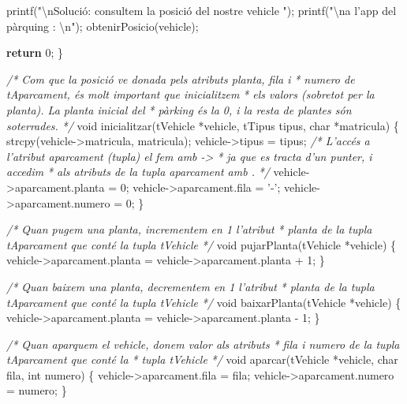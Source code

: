 \documentclass[]{book}
\newenvironment{Shaded}{\begin{snugshade}}{\end{snugshade}}
\newcommand{\DataTypeTok}[1]{\textcolor[rgb]{0.13,0.29,0.53}{#1}}
\newcommand{\DecValTok}[1]{\textcolor[rgb]{0.00,0.00,0.81}{#1}}
\newcommand{\CharTok}[1]{\textcolor[rgb]{0.31,0.60,0.02}{#1}}
\newcommand{\SpecialCharTok}[1]{\textcolor[rgb]{0.00,0.00,0.00}{#1}}
\newcommand{\StringTok}[1]{\textcolor[rgb]{0.31,0.60,0.02}{#1}}
\newcommand{\CommentTok}[1]{\textcolor[rgb]{0.56,0.35,0.01}{\textit{#1}}}
\newcommand{\ControlFlowTok}[1]{\textcolor[rgb]{0.13,0.29,0.53}{\textbf{#1}}}
\newcommand{\NormalTok}[1]{#1}
\begin{document}
\begin{Shaded}
\begin{Highlighting}[]
\NormalTok{    printf(}\StringTok{"}\SpecialCharTok{\textbackslash{}n}\StringTok{Solució: consultem la posició del nostre vehicle "}\NormalTok{);}
\NormalTok{    printf(}\StringTok{"}\SpecialCharTok{\textbackslash{}n}\StringTok{a l'app del pàrquing : }\SpecialCharTok{\textbackslash{}n}\StringTok{"}\NormalTok{);}
\NormalTok{    obtenirPosicio(vehicle);}
    
    \ControlFlowTok{return} \DecValTok{0}\NormalTok{;}
\NormalTok{\}}

\CommentTok{/* Com que la posició ve donada pels atributs planta, fila i}
\CommentTok{ * numero de tAparcament, és molt important que inicialitzem}
\CommentTok{ * els valors (sobretot per la planta). La planta inicial del}
\CommentTok{ * pàrking és la 0, i la resta de plantes són soterrades.}
\CommentTok{ */}
\DataTypeTok{void}\NormalTok{ inicialitzar(tVehicle *vehicle, tTipus tipus, }\DataTypeTok{char}\NormalTok{ *matricula) \{}
\NormalTok{    strcpy(vehicle->matricula, matricula);}
\NormalTok{    vehicle->tipus = tipus;}
    \CommentTok{/* L'accés a l'atribut aparcament (tupla) el fem amb ->}
\CommentTok{     * ja que es tracta d'un punter, i accedim}
\CommentTok{     * als atributs de la tupla aparcament amb . }
\CommentTok{     */}
\NormalTok{    vehicle->aparcament.planta = }\DecValTok{0}\NormalTok{;}
\NormalTok{    vehicle->aparcament.fila = }\CharTok{'-'}\NormalTok{;}
\NormalTok{    vehicle->aparcament.numero = }\DecValTok{0}\NormalTok{;}
\NormalTok{\}}

\CommentTok{/* Quan pugem una planta, incrementem en 1 l'atribut}
\CommentTok{ * planta de la tupla tAparcament que conté la tupla tVehicle }
\CommentTok{ */}
\DataTypeTok{void}\NormalTok{ pujarPlanta(tVehicle *vehicle) \{}
\NormalTok{    vehicle->aparcament.planta = vehicle->aparcament.planta + }\DecValTok{1}\NormalTok{;}
\NormalTok{\}}

\CommentTok{/* Quan baixem una planta, decrementem en 1 l'atribut}
\CommentTok{ * planta de la tupla tAparcament que conté la tupla tVehicle }
\CommentTok{ */}
\DataTypeTok{void}\NormalTok{ baixarPlanta(tVehicle *vehicle) \{}
\NormalTok{    vehicle->aparcament.planta = vehicle->aparcament.planta - }\DecValTok{1}\NormalTok{;}
\NormalTok{\}}

\CommentTok{/* Quan aparquem el vehicle, donem valor als atributs}
\CommentTok{ * fila i numero de la tupla tAparcament que conté la }
\CommentTok{ * tupla tVehicle }
\CommentTok{ */}
\DataTypeTok{void}\NormalTok{ aparcar(tVehicle *vehicle, }\DataTypeTok{char}\NormalTok{ fila, }\DataTypeTok{int}\NormalTok{ numero) \{}
\NormalTok{    vehicle->aparcament.fila = fila;}
\NormalTok{    vehicle->aparcament.numero = numero;}
\NormalTok{\}}


\end{Highlighting}
\end{Shaded}
\end{document}
